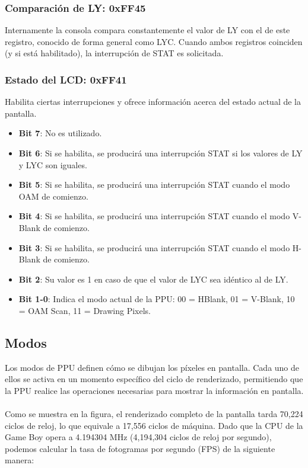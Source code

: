 \subsubsection{Comparación de LY: 0xFF45}
Internamente la consola compara constantemente el valor de LY con el de este registro, conocido de forma general como LYC. Cuando ambos registros coinciden (y si está habilitado), la interrupción de STAT es solicitada.

\subsubsection{Estado del LCD: 0xFF41}
Habilita ciertas interrupciones y ofrece información acerca del estado actual de la pantalla.

\begin{itemize}
    \item \textbf{Bit 7}: No es utilizado.
    \item \textbf{Bit 6}: Si se habilita, se producirá una interrupción STAT si los valores de LY y LYC son iguales.
    \item \textbf{Bit 5}: Si se habilita, se producirá una interrupción STAT cuando el modo OAM de comienzo.
    \item \textbf{Bit 4}: Si se habilita, se producirá una interrupción STAT cuando el modo V-Blank de comienzo.
    \item \textbf{Bit 3}: Si se habilita, se producirá una interrupción STAT cuando el modo H-Blank de comienzo.
    \item \textbf{Bit 2}: Su valor es 1 en caso de que el valor de LYC sea idéntico al de LY.
    \item \textbf{Bit 1-0}: Indica el modo actual de la PPU: 00 = HBlank, 01 = V-Blank, 10 = OAM Scan, 11 = Drawing Pixels.
\end{itemize}

\subsection{Modos}

Los modos de PPU definen cómo se dibujan los píxeles en pantalla. Cada uno de ellos se activa en un momento específico del ciclo de renderizado, permitiendo que la PPU realice las operaciones necesarias para mostrar la información en pantalla.
\\\\
Como se muestra en la figura, el renderizado completo de la pantalla tarda 70,224 ciclos de reloj, lo que equivale a 17,556 ciclos de máquina. Dado que la CPU de la Game Boy opera a 4.194304 MHz (4,194,304 ciclos de reloj por segundo), podemos calcular la tasa de fotogramas por segundo (FPS) de la siguiente manera:

